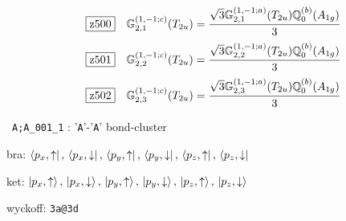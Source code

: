 \documentclass[fleqn,10pt,landscape]{jsarticle}
\begin{document}
\begin{dmath*}
\hspace*{3mm}\fbox{z500}\quad \mathbb{G}_{2,1}^{(1,-1;c)}(T_{2u})=\frac{\sqrt{3} \mathbb{G}_{2,1}^{(1,-1;a)}(T_{2u}) \mathbb{Q}_{0}^{(b)}(A_{1g})}{3}
\end{dmath*}
\begin{dmath*}
\hspace*{3mm}\fbox{z501}\quad \mathbb{G}_{2,2}^{(1,-1;c)}(T_{2u})=\frac{\sqrt{3} \mathbb{G}_{2,2}^{(1,-1;a)}(T_{2u}) \mathbb{Q}_{0}^{(b)}(A_{1g})}{3}
\end{dmath*}
\begin{dmath*}
\hspace*{3mm}\fbox{z502}\quad \mathbb{G}_{2,3}^{(1,-1;c)}(T_{2u})=\frac{\sqrt{3} \mathbb{G}_{2,3}^{(1,-1;a)}(T_{2u}) \mathbb{Q}_{0}^{(b)}(A_{1g})}{3}
\end{dmath*}
\vspace{5mm}

\noindent\textbullet\, \texttt{A;A_001_1} : '\texttt{A}'-'\texttt{A}' bond-cluster

\noindent\quad * bra: $\bra{p_{x},\uparrow},\, \bra{p_{x},\downarrow},\, \bra{p_{y},\uparrow},\, \bra{p_{y},\downarrow},\, \bra{p_{z},\uparrow},\, \bra{p_{z},\downarrow}$

\noindent\quad * ket: $\ket{p_{x},\uparrow},\, \ket{p_{x},\downarrow},\, \ket{p_{y},\uparrow},\, \ket{p_{y},\downarrow},\, \ket{p_{z},\uparrow},\, \ket{p_{z},\downarrow}$

\noindent\quad * wyckoff: \texttt{3a@3d}
\end{document}
